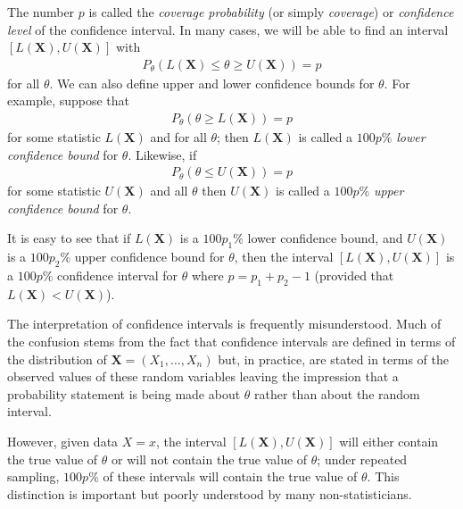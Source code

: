 \documentclass[11pt,a4paper]{article}
\begin{document}
The number \(p\) is called the \emph{coverage probability} (or simply \emph{coverage}) 
or \emph{confidence level} of the confidence interval. 
In many cases, 
we will be able to find an interval \(\left[L(\boldsymbol{X}), U(\boldsymbol{X})\right]\) with 
\begin{align}
P_{\theta}\left(L(\boldsymbol{X}) \leq \theta \geq U(\boldsymbol{X})\right) = p
\end{align}
for all \(\theta\). 
We can also define upper and lower confidence bounds for \(\theta\). 
For example, 
suppose that
\begin{align}
P_{\theta} \left(\theta \geq L(\boldsymbol{X})\right) = p
\end{align}
for some statistic \(L(\boldsymbol{X})\) and for all \(\theta\); 
then \(L(\boldsymbol{X})\) is called a \(100p\%\) \emph{lower confidence bound} for \(\theta\). 
Likewise, if
\begin{align}
P_{\theta} \left( \theta \leq U(\boldsymbol{X}) \right) = p
\end{align}
for some statistic \(U(\boldsymbol{X})\) and all \(\theta\) 
then \(U(\boldsymbol{X})\) is called a \(100p\%\) \emph{upper confidence bound} for \(\theta\). 

It is easy to see that if \(L(\boldsymbol{X})\) is a \(100p_{1}\%\) lower confidence bound, 
and \(U(\boldsymbol{X})\) is a \(100p_{2}\%\) upper confidence bound for \(\theta\), 
then the interval \(\left[L(\boldsymbol{X}), U(\boldsymbol{X})\right]\) 
is a \(100p\%\) confidence interval for \(\theta\) where \(p = p_{1} + p_{2} - 1\) 
(provided that \(L(\boldsymbol{X}) < U(\boldsymbol{X})\)).

The interpretation of confidence intervals is frequently misunderstood. 
Much of the confusion stems from the fact that confidence intervals are defined in terms of 
the distribution of \(\boldsymbol{X}=\left(X_{1}, \ldots, X_{n}\right)\) but, 
in practice, 
are stated in terms of the observed values of these random variables 
leaving the impression that a probability statement is being made about \(\theta\) rather than about the random interval.

However, 
given data \(X = x\), 
the interval \(\left[L(\boldsymbol{X}), U(\boldsymbol{X})\right]\) will either
contain the true value of \(\theta\) or will not contain the true value of \(\theta\); 
under repeated sampling, 
\(100p\%\) of these intervals will contain the true value of \(\theta\). 
This distinction is important but poorly understood by many non-statisticians.
\end{document}
